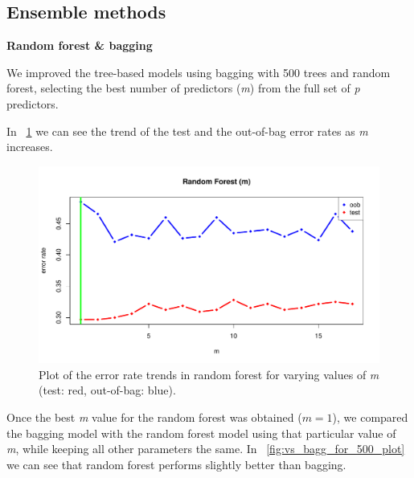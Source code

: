 \subsection{Ensemble methods}

\vspace{0.2cm}
\noindent
\textbf{Random forest \& bagging}

We improved the tree-based models using bagging with 500 trees and random forest, selecting the best number of predictors (\textit{m}) from the full set of \textit{p} predictors.

In \Fig~\ref{fig:m_best_for_500_plot} we can see the trend of the test and the out-of-bag error rates as \textit{m} increases.

\begin{figure}[H]
	\centering
	\includegraphics[width=0.5\linewidth]{ImageFiles/Classification/Trees/m_best_for_500_plot.pdf}
	\caption{Plot of the error rate trends in random forest for varying values of \textit{m} (test: red, out-of-bag: blue).}
	\label{fig:m_best_for_500_plot}
\end{figure}

Once the best \textit{m} value for the random forest was obtained ($m = 1$), we compared the bagging model with the random forest model using that particular value of \textit{m}, while keeping all other parameters the same.
In \Fig~\ref{fig:vs_bagg_for_500_plot} we can see that random forest performs slightly better than bagging.

